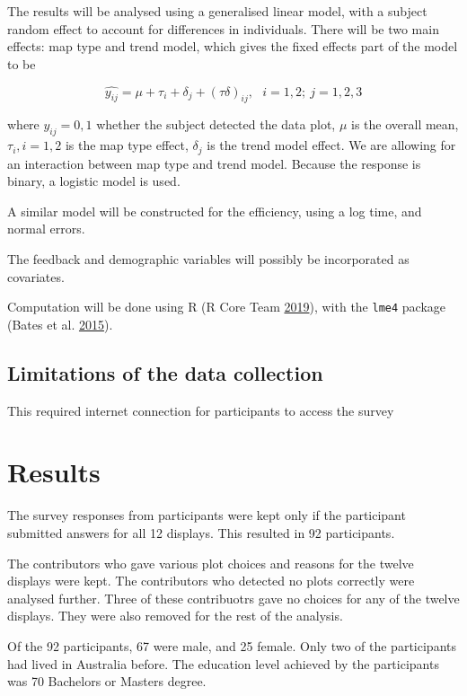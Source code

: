 \documentclass[conference,final,]{IEEEtran}
\begin{document}
The results will be analysed using a generalised linear model, with a
subject random effect to account for differences in individuals. There
will be two main effects: map type and trend model, which gives the
fixed effects part of the model to be

\[\widehat{y_{ij}} = \mu + \tau_i + \delta_j + (\tau\delta)_{ij}, ~~~ i=1,2; ~j=1,2,3\]

where \(y_{ij} = 0, 1\) whether the subject detected the data plot,
\(\mu\) is the overall mean, \(\tau_i, i=1,2\) is the map type effect,
\(\delta_j\) is the trend model effect. We are allowing for an
interaction between map type and trend model. Because the response is
binary, a logistic model is used.

A similar model will be constructed for the efficiency, using a log
time, and normal errors.

The feedback and demographic variables will possibly be incorporated as
covariates.

Computation will be done using R (R Core Team
\protect\hyperlink{ref-RCore}{2019}), with the \texttt{lme4} package
(Bates et al. \protect\hyperlink{ref-lme4}{2015}).

\hypertarget{limitations-of-the-data-collection}{%
\subsection{Limitations of the data
collection}\label{limitations-of-the-data-collection}}

This required internet connection for participants to access the survey

\hypertarget{results}{%
\section{Results}\label{results}}

The survey responses from participants were kept only if the participant
submitted answers for all 12 displays. This resulted in 92 participants.

The contributors who gave various plot choices and reasons for the
twelve displays were kept. The contributors who detected no plots
correctly were analysed further. Three of these contribuotrs gave no
choices for any of the twelve displays. They were also removed for the
rest of the analysis.

Of the 92 participants, 67 were male, and 25 female. Only two of the
participants had lived in Australia before. The education level achieved
by the participants was 70 Bachelors or Masters degree.
\end{document}
